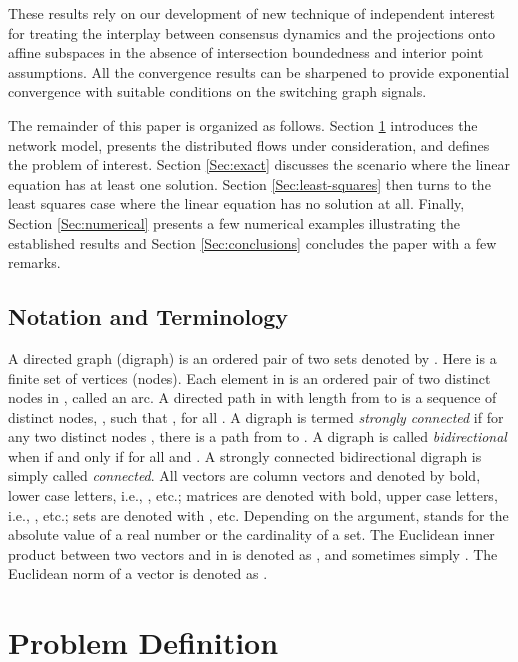\documentclass[a4paper, 11pt]{article}
\begin{document}
These results rely on our development of new technique of independent interest for treating the interplay between consensus dynamics and the projections onto affine subspaces in the absence of  intersection boundedness and interior point assumptions. All the convergence results  can be sharpened to provide exponential convergence with suitable conditions on the switching graph signals.

The remainder of this paper is organized as follows. Section \ref{Sec:Problem} introduces the network model, presents the distributed flows under consideration, and defines the problem of interest. Section \ref{Sec:exact} discusses the scenario where the linear equation has at least one solution. Section \ref{Sec:least-squares} then turns to the least squares case where the linear equation has no solution at all. Finally, Section \ref{Sec:numerical} presents a few numerical examples illustrating the established  results and Section \ref{Sec:conclusions} concludes the paper with a few remarks.


\subsection*{Notation and Terminology}

A directed graph (digraph) is an ordered pair of two sets denoted by  \cite{god}. Here   is a finite set of  vertices (nodes). Each element in  is an ordered pair of two distinct  nodes in , called an arc.  A  directed path in  with length  from  to  is a  sequence of distinct nodes, , such that  , for all . A digraph  is termed {\it strongly connected} if for any two distinct nodes , there is a  path from  to . A digraph is called {\it bidirectional} when  if and only if  for all  and . A strongly connected bidirectional digraph  is  simply called {\it connected}. All vectors are column vectors and denoted by bold, lower case letters, i.e., ,  etc.; matrices are denoted with bold, upper case letters, i.e.,  ,  etc.;  sets are denoted with , etc. Depending on the argument,  stands for the absolute value of a real number or the cardinality of a set.  The Euclidean inner product between two vectors  and  in  is denoted as , and sometimes  simply  .  The Euclidean norm of a vector is denoted as .







\section{Problem Definition}\label{Sec:Problem}
\end{document}
